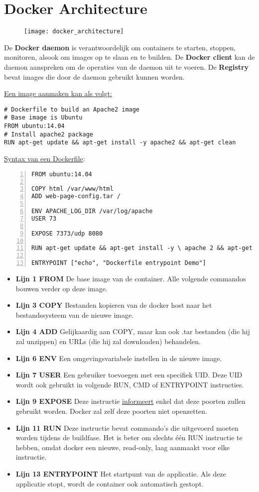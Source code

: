 \documentclass{report}
\begin{document}
	\section{Docker Architecture}
	\begin{figure}[ht]
		\texttt{[image: docker\_architecture]}
	\end{figure}
	De \textbf{Docker daemon} is verantwoordelijk om containers te starten, stoppen, monitoren, alsook om images op te slaan en te builden. De \textbf{Docker client} kan de daemon aanspreken om de operaties van de daemon uit te voeren. De \textbf{Registry} bevat images die door de daemon gebruikt kunnen worden.

	\underline{Een image aanmaken kan als volgt:}
	\begin{lstlisting}
# Dockerfile to build an Apache2 image
# Base image is Ubuntu
FROM ubuntu:14.04
# Install apache2 package
RUN apt-get update && apt-get install -y apache2 && apt-get clean
	\end{lstlisting}

	\underline{Syntax van een Dockerfile}:
	\begin{lstlisting}[numbers=left]
FROM ubuntu:14.04

COPY html /var/www/html
ADD web-page-config.tar /

ENV APACHE_LOG_DIR /var/log/apache
USER 73

EXPOSE 7373/udp 8080

RUN apt-get update && apt-get install -y \ apache 2 && apt-get clean

ENTRYPOINT ["echo", "Dockerfile entrypoint Demo"]
	\end{lstlisting}
	\begin{itemize}
		\item[\info] \textbf{Lijn 1 FROM} De base image van de container. Alle volgende commandos bouwen verder op deze image. 
		\item[\info] \textbf{Lijn 3 COPY} Bestanden kopieren van de docker host naar het bestandssysteem van de nieuwe image.
		\item[\info] \textbf{Lijn 4 ADD} Gelijkaardig aan COPY, maar kan ook .tar bestanden (die hij zal unzippen) en URLs (die hij zal downloaden) behandelen.
		\item[\info] \textbf{Lijn 6 ENV} Een omgevingsvariabele instellen in de nieuwe image.
		\item[\info] \textbf{Lijn 7 USER} Een gebruiker toevoegen met een specifiek UID. Deze UID wordt ook gebruikt in volgende RUN, CMD of ENTRYPOINT instructies.
		\item[\info] \textbf{Lijn 9 EXPOSE} Deze instructie \underline{informeert} enkel dat  deze poorten zullen gebruikt worden. Docker zal zelf deze poorten niet openzetten.
		\item[\info] \textbf{Lijn 11 RUN} Deze instructie bevat commando's die uitgevoerd moeten worden tijdens de buildfase. Het is beter om slechts één RUN instructie te hebben, omdat docker een nieuwe, read-only, laag aanmaakt voor elke instructie.
		\item[\info] \textbf{Lijn 13 ENTRYPOINT} Het startpunt van de applicatie. Als deze applicatie stopt, wordt de container ook automatisch gestopt.
	\end{itemize}
\end{document}
